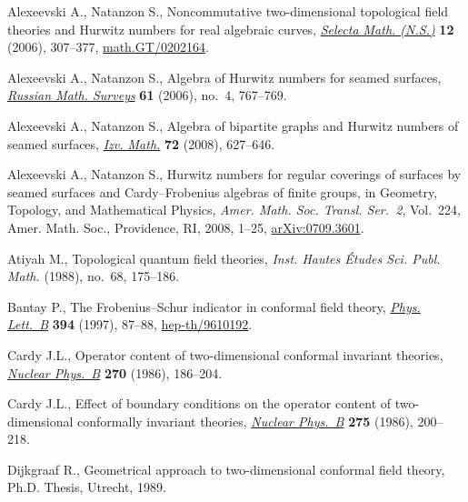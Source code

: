 \documentclass[pdftex]{sigma}
\begin{document}
\begin{thebibliography}{99}

\footnotesize\itemsep=0pt

Alexeevski A., Natanzon S.,
Noncommutative two-dimensional topological f\/ield theories and Hurwitz numbers for real algebraic curves,
\href{http://dx.doi.org/10.1007/s00029-006-0028-y}{{\it Selecta Math. (N.S.)}} {\bf 12} (2006), 307--377,
\href{http://arxiv.org/abs/math.GT/0202164}{math.GT/0202164}.

Alexeevski A., Natanzon S.,
Algebra of Hurwitz numbers for seamed surfaces,
\href{http://dx.doi.org/10.1070/RM2006v061n04ABEH004345}{{\it Russian Math. Surveys}} {\bf 61} (2006), no.~4, 767--769.

Alexeevski A., Natanzon S.,
Algebra of bipartite graphs and Hurwitz numbers of seamed surfaces,
\href{http://dx.doi.org/10.1070/IM2008v072n04ABEH002416}{{\it Izv. Math.}} {\bf 72} (2008), 627--646.

Alexeevski A., Natanzon S.,
Hurwitz numbers for regular coverings of surfaces by seamed surfaces and Cardy--Frobenius algebras of f\/inite groups,
in Geometry, Topology, and Mathematical Physics, {\it Amer. Math. Soc. Transl. Ser.~2}, Vol.~224, Amer. Math. Soc., Providence, RI, 2008, 1--25,
\href{http://arxiv.org/abs/0709.3601}{arXiv:0709.3601}.

Atiyah M.,
Topological quantum f\/ield theories,
{\it Inst. Hautes \'Etudes Sci. Publ. Math.}   (1988), no.~68, 175--186.

Bantay P.,
The Frobenius--Schur indicator in conformal f\/ield theory,
\href{http://dx.doi.org/10.1016/S0370-2693(96)01662-0}{{\it Phys. Lett.~B}} {\bf 394} (1997),   87--88,
\href{http://arxiv.org/abs/hep-th/9610192}{hep-th/9610192}.

Cardy J.L.,
Operator content of two-dimensional conformal invariant theories,
\href{http://dx.doi.org/10.1016/0550-3213(86)90552-3}{{\it Nuclear Phys.~B}} {\bf 270} (1986), 186--204.

Cardy J.L.,
Ef\/fect of boundary conditions on the operator content of two-dimensional conformally invariant theories,
\href{http://dx.doi.org/10.1016/0550-3213(86)90596-1}{{\it Nuclear Phys.~B}} {\bf 275} (1986), 200--218.

Dijkgraaf  R.,
Geometrical approach to two-dimensional conformal f\/ield theory, Ph.D. Thesis, Utrecht, 1989.


\end{thebibliography}
\end{document}
